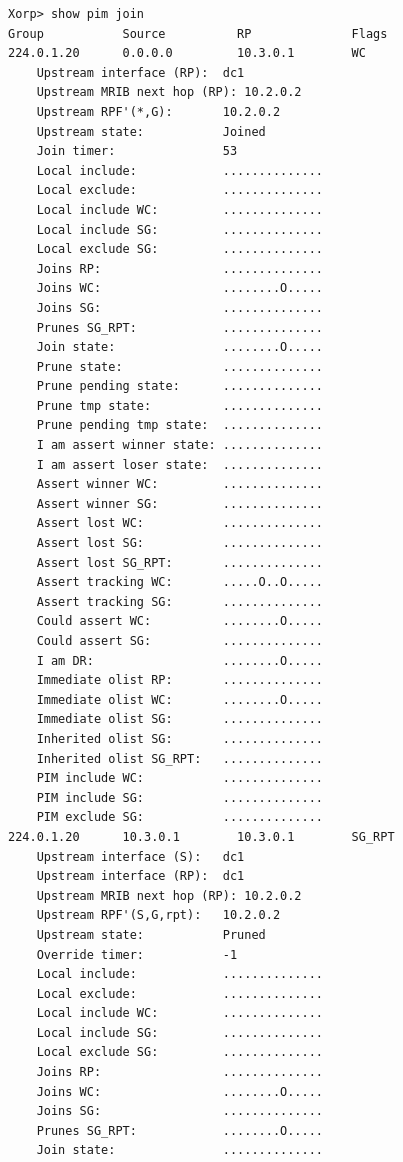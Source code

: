 \documentclass[11pt]{report}
\begin{document}
\begin{itemize}
\begin{verbatim}
Xorp> show pim join 
Group           Source          RP              Flags
224.0.1.20      0.0.0.0         10.3.0.1        WC   
    Upstream interface (RP):  dc1
    Upstream MRIB next hop (RP): 10.2.0.2
    Upstream RPF'(*,G):       10.2.0.2
    Upstream state:           Joined 
    Join timer:               53
    Local include:            ..............
    Local exclude:            ..............
    Local include WC:         ..............
    Local include SG:         ..............
    Local exclude SG:         ..............
    Joins RP:                 ..............
    Joins WC:                 ........O.....
    Joins SG:                 ..............
    Prunes SG_RPT:            ..............
    Join state:               ........O.....
    Prune state:              ..............
    Prune pending state:      ..............
    Prune tmp state:          ..............
    Prune pending tmp state:  ..............
    I am assert winner state: ..............
    I am assert loser state:  ..............
    Assert winner WC:         ..............
    Assert winner SG:         ..............
    Assert lost WC:           ..............
    Assert lost SG:           ..............
    Assert lost SG_RPT:       ..............
    Assert tracking WC:       .....O..O.....
    Assert tracking SG:       ..............
    Could assert WC:          ........O.....
    Could assert SG:          ..............
    I am DR:                  ........O.....
    Immediate olist RP:       ..............
    Immediate olist WC:       ........O.....
    Immediate olist SG:       ..............
    Inherited olist SG:       ..............
    Inherited olist SG_RPT:   ..............
    PIM include WC:           ..............
    PIM include SG:           ..............
    PIM exclude SG:           ..............
224.0.1.20      10.3.0.1        10.3.0.1        SG_RPT 
    Upstream interface (S):   dc1
    Upstream interface (RP):  dc1
    Upstream MRIB next hop (RP): 10.2.0.2
    Upstream RPF'(S,G,rpt):   10.2.0.2
    Upstream state:           Pruned 
    Override timer:           -1
    Local include:            ..............
    Local exclude:            ..............
    Local include WC:         ..............
    Local include SG:         ..............
    Local exclude SG:         ..............
    Joins RP:                 ..............
    Joins WC:                 ........O.....
    Joins SG:                 ..............
    Prunes SG_RPT:            ........O.....
    Join state:               ..............

\end{verbatim}
\end{itemize}
\end{document}

